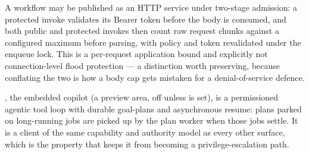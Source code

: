 A workflow may be published as an HTTP service under two-stage admission: a
protected invoke validates its Bearer token before the body is consumed, and both
public and protected invokes then count raw request chunks against a configured
maximum before parsing, with policy and token revalidated under the enqueue lock.
This is a per-request application bound and explicitly not
connection-level flood protection --- a distinction worth preserving, because
conflating the two is how a body cap gets mistaken for a denial-of-service defence.

\aria{}, the embedded copilot (a preview area, off unless
 is set), is a permissioned agentic tool loop with
durable goal-plans and asynchronous resume: plans parked on long-running jobs are picked up
by the plan worker when those jobs settle. It is a client of the same capability
and authority model as every other surface, which is the property that keeps it
from becoming a privilege-escalation path.
